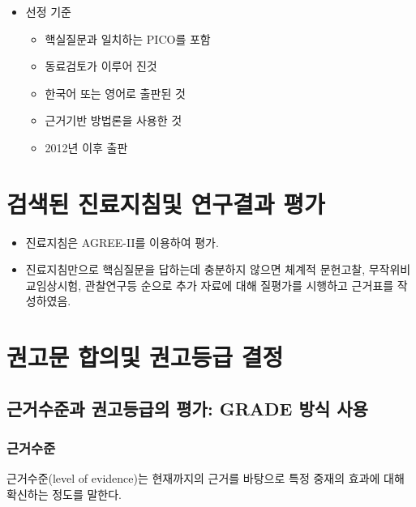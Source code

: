 \documentclass[]{book}
\providecommand{\tightlist}{%
  \setlength{\itemsep}{0pt}\setlength{\parskip}{0pt}}
\begin{document}
\begin{itemize}
\tightlist
\item
  선정 기준

  \begin{itemize}
  \tightlist
  \item
    핵실질문과 일치하는 PICO를 포함
  \item
    동료검토가 이루어 진것
  \item
    한국어 또는 영어로 출판된 것
  \item
    근거기반 방법론을 사용한 것
  \item
    2012년 이후 출판
  \end{itemize}
\end{itemize}

\hypertarget{section-56}{%
\section{검색된 진료지침및 연구결과 평가}\label{section-56}}

\begin{itemize}
\tightlist
\item
  진료지침은 AGREE-II를 이용하여 평가.
\item
  진료지침만으로 핵심질문을 답하는데 충분하지 않으면 체계적 문헌고찰, 무작위비교임상시험, 관찰연구등 순으로 추가 자료에 대해 질평가를 시행하고 근거표를 작성하였음.
\end{itemize}

\hypertarget{section-57}{%
\section{권고문 합의및 권고등급 결정}\label{section-57}}

\hypertarget{grade--}{%
\subsection*{근거수준과 권고등급의 평가: GRADE 방식 사용}\label{grade--}}

\hypertarget{section-58}{%
\subsubsection*{근거수준}\label{section-58}}

근거수준(level of evidence)는 현재까지의 근거를 바탕으로 특정 중재의 효과에 대해 확신하는 정도를 말한다.
\end{document}
